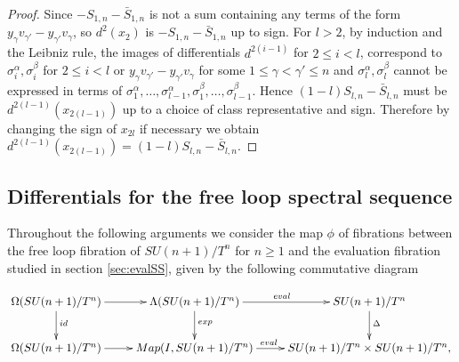 \documentclass{article}
\theoremstyle{plain}
\theoremstyle{definition}
\numberwithin{thm}{section}
\begin{document}
\begin{proof}
				Since $-S_{1,n}-\bar{S}_{1,n}$ is not a sum containing any terms of the form $y_\gamma v_{\gamma'}-y_{\gamma'}v_\gamma$,
				so $d^{2}(x_{2})$ is $-S_{1,n}-\bar{S}_{1,n}$ up to sign.
				For $l>2$, by induction and the Leibniz rule, the images of differentials $d^{2(i-1)}$ for $2 \leq i<l$,
				correspond to $\sigma^\alpha_i,\sigma^\beta_i$ for $2\leq i<l$ 
				or $y_\gamma v_{\gamma'}-y_{\gamma'}v_\gamma$ for some $1\leq \gamma < \gamma' \leq n$
				and $\sigma^\alpha_l,\sigma^\beta_l$ cannot be expressed in terms of $\sigma^\alpha_1,\dots,\sigma^\alpha_{l-1},\sigma^\beta_1,\dots,\sigma^\beta_{l-1}$.
				Hence $(1-l)S_{l,n}-\bar{S}_{l,n}$ must be $d^{2(l-1)}(x_{2(l-1)})$ up to a choice of class representative and sign.
				Therefore by changing the sign of $x_{2l}$ if necessary we obtain 
				$d^{2(l-1)}(x_{2(l-1)})=(1-l)S_{l,n}-\bar{S}_{l,n}$.
				\end{proof}
				
					
			\subsection{Differentials for the free loop spectral sequence}\label{sec:diff}
			
			Throughout the following arguments we consider the map $\phi$ of fibrations between the free loop fibration of $SU(n+1)/T^n$ for $n \geq 1$ 
			and the evaluation fibration studied in section \ref{sec:evalSS},
			given by the following commutative diagram
			
			\begin{equation*}\label{fig:fibcd}
						\xymatrix{
							{\Omega(SU(n+1)/T^n)} \ar[r]^(.5){} \ar[d]^(.45){id} & {\Lambda(SU(n+1)/T^n)} \ar[r]^{eval} \ar[d]^(.45){exp}  & {SU(n+1)/T^n} \ar[d]^(.45){\Delta} \\
							{\Omega(SU(n+1)/T^n)} \ar[r]^(.45){}   							 & {Map(I,SU(n+1)/T^n)} 	 \ar[r]^(.425){eval}  					 & {SU(n+1)/T^n\times SU(n+1)/T^n} ,}
			\end{equation*}
			
\end{document}
